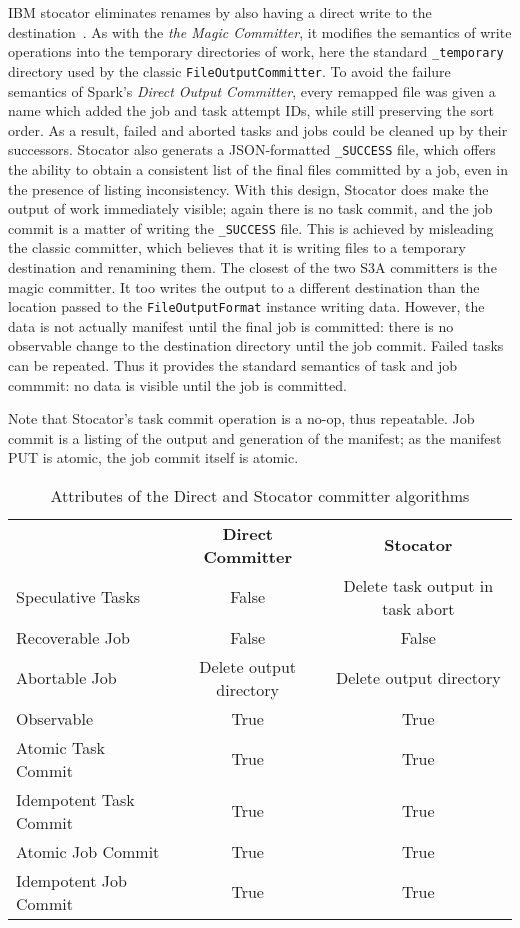 \documentclass[9pt,technote]{IEEEtran}
\begin{document}
IBM stocator eliminates renames by also having a direct write to the
destination\ \cite{DBLP:journals/corr/abs-1709-01812}.
As with the \emph{the Magic Committer}, it modifies the semantics of write
operations into the temporary directories of work, here the standard
\texttt{\_temporary} directory used by the classic \texttt{FileOutputCommitter}.
To avoid the failure semantics of Spark's \emph{Direct Output Committer},
every remapped file was given a name which added the job and task attempt IDs,
while still preserving the sort order.
As a result, failed and aborted tasks and jobs could be cleaned up by their successors.
Stocator also generats a JSON-formatted \texttt{\_SUCCESS} file, which offers
the ability to obtain a consistent list of the final files committed by a job,
even in the presence of listing inconsistency.
With this design, Stocator does make the output of work immediately visible;
again there is no task commit, and the job commit is a matter of writing
the \texttt{\_SUCCESS} file.
This is achieved by misleading the classic committer, which believes that
it is writing files to a temporary destination and renamining them.
The closest of the two S3A committers is the magic committer.
It too writes the output to a different destination than the location passed
to the \texttt{FileOutputFormat} instance writing data.
However, the data is not actually manifest until the final job is committed:
there is no observable change to the destination directory until the job commit.
Failed tasks can be repeated.
Thus it provides the standard semantics of task and job commmit: no data is
visible until the job is committed.

Note that Stocator's task commit operation is a no-op, thus repeatable.
Job commit is a listing of the output and generation of the manifest;
as the manifest PUT is atomic, the job commit itself is atomic.

\begin{table}
  \label{tab:other-committer-attributes}
  \begin{tabular}{ l c c }
    \hline
    & \textbf{Direct Committer} & \textbf{Stocator} \\
    Speculative Tasks & False & Delete task output in task abort \\
    Recoverable Job & False & False \\
    Abortable Job & Delete output directory & Delete output directory \\
    Observable & True & True \\
    Atomic Task Commit & True & True \\
    Idempotent Task Commit & True & True \\
    Atomic Job Commit & True & True \\
    Idempotent Job Commit & True & True \\
    \hline
  \end{tabular}
  \caption{Attributes of the Direct and Stocator committer algorithms}
\end{table}
\end{document}

